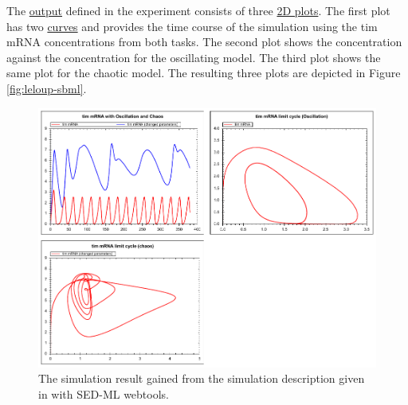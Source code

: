 The \hyperref[class:output]{output} defined in the experiment consists of three \hyperref[class:plot2D]{2D plots}. The first plot has two \hyperref[class:curve]{curves} and provides the time course of the simulation using the tim mRNA concentrations from both tasks. The second plot shows the  concentration against the  concentration for the oscillating model. The third plot shows the same plot for the chaotic model. The resulting three plots are depicted in Figure \ref{fig:leloup-sbml}. 


\begin{figure}[ht]
    \centering
    \begin{minipage}{0.47\textwidth}
        \centering
        \includegraphics[width=1.0\textwidth]{examples/leloup-sbml/results/leloup-sbml}
        \caption{The simulation result gained from the simulation description given in  with SED-ML webtools.}
    \end{minipage}\hfill
    \begin{minipage}{0.47\textwidth}
        \centering

\end{minipage}
\end{figure}

